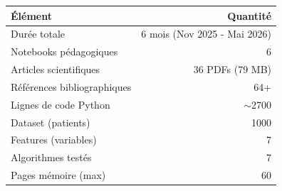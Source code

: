 \documentclass[a4paper,11pt]{article}
\begin{document}
\begin{center}
\begin{tabular}{|l|r|}
\hline
\textbf{Élément} & \textbf{Quantité} \\
\hline
Durée totale & 6 mois (Nov 2025 - Mai 2026) \\
Notebooks pédagogiques & 6 \\
Articles scientifiques & 36 PDFs (79 MB) \\
Références bibliographiques & 64+ \\
Lignes de code Python & $\sim$2700 \\
Dataset (patients) & 1000 \\
Features (variables) & 7 \\
Algorithmes testés & 7 \\
Pages mémoire (max) & 60 \\
\hline
\end{tabular}
\end{center}

\vspace{2cm}

\begin{center}
\end{center}
\end{document}
